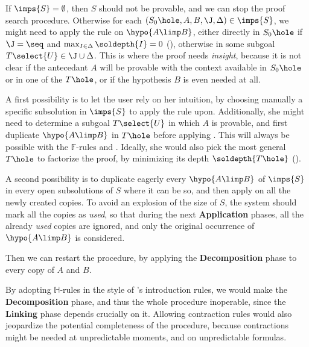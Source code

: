 \begin{description}
    If $\imps{S} = \emptyset$, then $S$ should not be provable, and we can stop
    the proof search procedure. Otherwise for each $(S_0\hole, A, B, \J, \Delta)
    \in \imps{S}$, we might need to apply the \rsf{{\limp}{-}} rule on $\hypo{A
    \limp B}$, either directly in $S_0\hole$ if $\J = {\seq}$ and $\max_{I \in
    \Delta}{\soldepth{I}} = 0$ (), otherwise in some subgoal
    $T\select{U} \in \J \cup \Delta$. This is where the proof needs
    \emph{insight}, because it is not clear if the antecedant $A$ will be
    provable with the context available in $S_0\hole$ or in one of the $T\hole$,
    or if the hypothesis $B$ is even needed at all.

    A first possibility is to let the user rely on her intuition, by choosing
    manually a specific subsolution in $\imps{S}$ to apply the \rsf{{\limp}{-}}
    rule upon. Additionally, she might need to determine a subgoal $T\select{U}$
    in which $A$ is provable, and first duplicate $\hypo{A\limp B}$ in $T\hole$
    before applying \rsf{{\limp}{-}}. This will always be possible with the
    $\mathbb{F}$-rules  and .
    Ideally, she would also pick the most general $T\hole$ to factorize the
    proof, by minimizing its depth $\soldepth{T\hole}$ ().

    A second possibility is to duplicate eagerly every $\hypo{A \limp B}$ of
    $\imps{S}$ in every open subsolutions of $S$ where it can be so, and then
    apply \rsf{{\limp}{-}} on all the newly created copies. To avoid an
    explosion of the size of $S$, the system should mark all the copies as
    \emph{used}, so that during the next \textbf{Application} phases, all the
    already \emph{used} copies are ignored, and only the original occurrence of
    $\hypo{A \limp B}$ is considered.

    Then we can restart the procedure, by applying the \textbf{Decomposition}
    phase to every copy of $A$ and $B$.
\end{description}

\begin{remark}
  By adopting $\mathbb{H}$-rules in the style of 's introduction
  rules, we would make the \textbf{Decomposition} phase, and thus the whole
  procedure inoperable, since the \textbf{Linking} phase depends crucially on
  it. Allowing contraction rules would also jeopardize the potential
  completeness of the procedure, because contractions might be needed at
  unpredictable moments, and on unpredictable formulas.
\end{remark}

